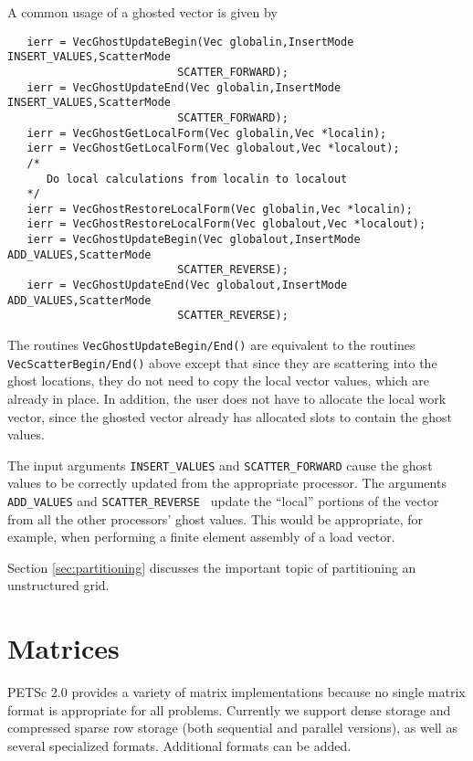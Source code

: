 A common usage of a ghosted vector is given by
 
\begin{verbatim}
   ierr = VecGhostUpdateBegin(Vec globalin,InsertMode INSERT_VALUES,ScatterMode
                          SCATTER_FORWARD);
   ierr = VecGhostUpdateEnd(Vec globalin,InsertMode INSERT_VALUES,ScatterMode
                          SCATTER_FORWARD);
   ierr = VecGhostGetLocalForm(Vec globalin,Vec *localin);
   ierr = VecGhostGetLocalForm(Vec globalout,Vec *localout);
   /*
      Do local calculations from localin to localout 
   */
   ierr = VecGhostRestoreLocalForm(Vec globalin,Vec *localin);
   ierr = VecGhostRestoreLocalForm(Vec globalout,Vec *localout);
   ierr = VecGhostUpdateBegin(Vec globalout,InsertMode ADD_VALUES,ScatterMode
                          SCATTER_REVERSE);
   ierr = VecGhostUpdateEnd(Vec globalout,InsertMode ADD_VALUES,ScatterMode
                          SCATTER_REVERSE);
\end{verbatim}
      
The routines {\tt VecGhostUpdateBegin/End()} are equivalent to the routines {\tt VecScatterBegin/End()}
above except that since they are scattering into the ghost locations, they do not need
to copy the local vector values, which are already in place. In addition, the user does not
have to allocate the local work vector, since the ghosted vector already has allocated 
slots to contain the ghost values.

The input arguments {\tt INSERT\_VALUES} and {\tt SCATTER\_FORWARD}
cause the ghost values to be correctly updated from the appropriate
processor. The arguments {\tt ADD\_VALUES} and {\tt SCATTER\_REVERSE }
update the ``local'' portions of the vector from all the other
processors' ghost values.  This would be appropriate, for example,
when performing a finite element assembly of a load vector.

Section \ref{sec:partitioning} discusses the important topic of partitioning 
an unstructured grid.


\chapter{Matrices}
\label{chapter:matrices}

PETSc 2.0 provides a variety of matrix implementations because no
single matrix format is appropriate for all problems.  Currently we
support dense storage and compressed sparse row storage (both
sequential and parallel versions), as well as several specialized
formats.  Additional formats can be added.

